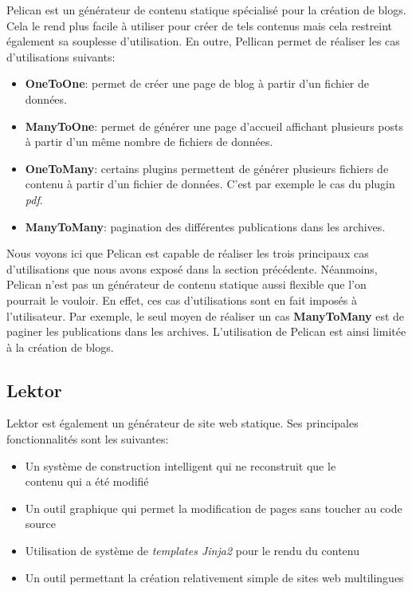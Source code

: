 	Pelican est un générateur de contenu statique spécialisé pour la création de blogs. Cela le rend plus facile à utiliser pour créer de tels contenus mais cela restreint également sa souplesse d'utilisation. En outre, Pellican permet de réaliser les cas d'utilisations suivants:\\
	
	\begin{itemize}
		\item \textbf{OneToOne}: permet de créer une page de blog à partir d'un fichier de données.
		\item \textbf{ManyToOne}: permet de générer une page d'accueil affichant plusieurs posts à partir d'un même nombre de fichiers de données.
		\item \textbf{OneToMany}: certains plugins permettent de générer plusieurs fichiers de contenu à partir d'un fichier de données. C'est par exemple le cas du plugin \textit{pdf}.
		\item \textbf{ManyToMany}: pagination des différentes publications dans les archives.
	\end{itemize}
	
	Nous voyons ici que Pelican est capable de réaliser les trois principaux cas d'utilisations que nous avons exposé dans la section précédente. Néanmoins, Pelican n'est pas un générateur de contenu statique aussi flexible que l'on pourrait le vouloir. En effet, ces cas d'utilisations sont en fait imposés à l'utilisateur. Par exemple, le seul moyen de réaliser un cas \textbf{ManyToMany} est de paginer les publications dans les archives. L'utilisation de Pelican est ainsi limitée à la création de blogs.
	
	\subsection*{Lektor}
	Lektor \cite{Lektor} est également un générateur de site web statique. Ses principales fonctionnalités sont les suivantes:
	
	\begin{itemize}
		\item Un système de construction intelligent qui ne reconstruit que le \\contenu qui a été modifié
		\item Un outil graphique qui permet la modification de pages sans toucher au code source
		\item Utilisation de système de \textit{templates Jinja2} pour le rendu du contenu
		\item Un outil permettant la création relativement simple de sites web multilingues
	\end{itemize}
	
